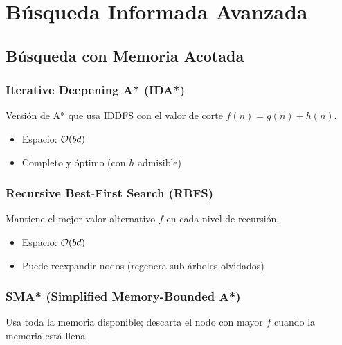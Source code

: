 \section{Búsqueda Informada Avanzada}

\subsection{Búsqueda con Memoria Acotada}

\subsubsection{Iterative Deepening A* (IDA*)}
Versión de A* que usa IDDFS con el valor de corte $f(n) = g(n) + h(n)$.
\begin{itemize}
    \item Espacio: $\mathcal{O}(bd)$
    \item Completo y óptimo (con $h$ admisible)
\end{itemize}

\subsubsection{Recursive Best-First Search (RBFS)}
Mantiene el mejor valor alternativo $f$ en cada nivel de recursión.
\begin{itemize}
    \item Espacio: $\mathcal{O}(bd)$
    \item Puede reexpandir nodos (regenera sub-árboles olvidados)
\end{itemize}

\subsubsection{SMA* (Simplified Memory-Bounded A*)}
Usa toda la memoria disponible; descarta el nodo con mayor $f$ cuando la memoria está llena.

